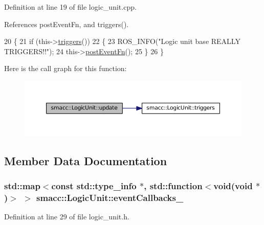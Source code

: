 Definition at line 19 of file logic\+\_\+unit.\+cpp.



References post\+Event\+Fn, and triggers().


\begin{DoxyCode}
20 \{
21     \textcolor{keywordflow}{if} (this->\hyperlink{classsmacc_1_1LogicUnit_ae975a96f0210412e1cb4a7b5b948ade6}{triggers}())
22     \{
23         ROS\_INFO(\textcolor{stringliteral}{"Logic unit base REALLY TRIGGERS!!"});
24         this->\hyperlink{classsmacc_1_1LogicUnit_ac75aaeeea0e8d3667763a332ecfd65f7}{postEventFn}();
25     \}
26 \}
\end{DoxyCode}


Here is the call graph for this function\+:
\nopagebreak
\begin{figure}[H]
\begin{center}
\leavevmode
\includegraphics[width=350pt]{classsmacc_1_1LogicUnit_afcec0608a17e039791403472a2411539_cgraph}
\end{center}
\end{figure}




\subsection{Member Data Documentation}
\subsubsection[{\texorpdfstring{event\+Callbacks\+\_\+}{eventCallbacks_}}]{\setlength{\rightskip}{0pt plus 5cm}std\+::map$<$const std\+::type\+\_\+info $\ast$, std\+::function$<$void(void $\ast$)$>$ $>$ smacc\+::\+Logic\+Unit\+::event\+Callbacks\+\_\+}\hypertarget{classsmacc_1_1LogicUnit_a29196899a02ed436e9ba68784b4d5cf4}{}\label{classsmacc_1_1LogicUnit_a29196899a02ed436e9ba68784b4d5cf4}


Definition at line 29 of file logic\+\_\+unit.\+h.



